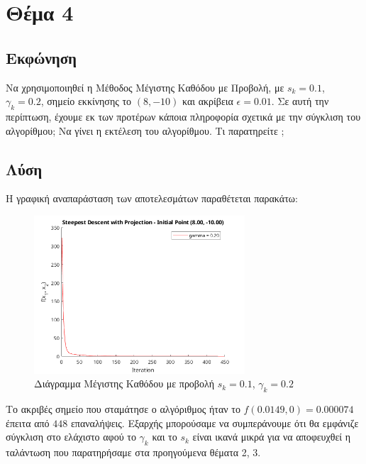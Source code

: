 \documentclass{report}
\begin{document}
\chapter{Θέμα 4}
\section{Εκφώνηση}
Να χρησιμοποιηθεί η Μέθοδος Μέγιστης Καθόδου με Προβολή, με $s_k = 0.1$, $\gamma_k = 0.2$,
σημείο εκκίνησης το $(8, -10)$ και ακρίβεια $\epsilon = 0.01$. Σε αυτή την περίπτωση, έχουμε εκ των
προτέρων κάποια πληροφορία σχετικά με την σύγκλιση του αλγορίθμου;
Να γίνει η εκτέλεση του αλγορίθμου. Τι παρατηρείτε
;

\section{Λύση}
Η γραφική αναπαράσταση των αποτελεσμάτων παραθέτεται παρακάτω:
\begin{figure}[H]
    \centering
    \includegraphics[width=0.7\textwidth]{media/thema4.png}
    \caption{Διάγραμμα Μέγιστης Καθόδου με προβολή $s_k = 0.1$, $\gamma_k = 0.2$} 
\end{figure}
Το ακριβές σημείο που σταμάτησε ο αλγόριθμος ήταν το $f(0.0149, 0) = 0.000074$ έπειτα από
$448$ επαναλήψεις. Εξαρχής μπορούσαμε να συμπεράνουμε ότι θα εμφάνιζε σύγκλιση στο ελάχιστο
αφού το $\gamma_k$ και το $s_k$ είναι ικανά μικρά για να αποφευχθεί η ταλάντωση που παρατηρήσαμε 
στα προηγούμενα θέματα 2, 3.

\end{document}
